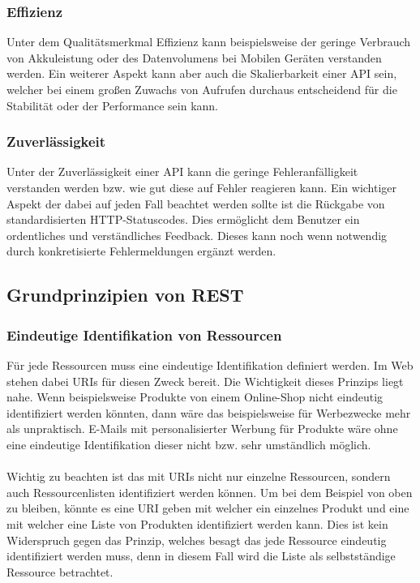 \subsubsection{Effizienz}
Unter dem Qualitätsmerkmal Effizienz kann beispielsweise der geringe Verbrauch von Akkuleistung oder des Datenvolumens bei Mobilen Geräten verstanden werden. Ein weiterer Aspekt kann aber auch die Skalierbarkeit einer \gls{API} sein, welcher bei einem großen Zuwachs von Aufrufen durchaus entscheidend für die Stabilität oder der Performance sein kann.

\subsubsection{Zuverlässigkeit}
Unter der Zuverlässigkeit einer \gls{API} kann die geringe Fehleranfälligkeit verstanden werden bzw. wie gut diese auf Fehler reagieren kann. Ein wichtiger Aspekt der dabei auf jeden Fall beachtet werden sollte ist die Rückgabe von standardisierten HTTP-Statuscodes. Dies ermöglicht dem Benutzer ein ordentliches und verständliches Feedback. Dieses kann noch wenn notwendig durch konkretisierte Fehlermeldungen ergänzt werden.

\subsection{Grundprinzipien von REST}\label{sec:basePrincipleREST}
\subsubsection{Eindeutige Identifikation von Ressourcen}
Für jede Ressourcen muss eine eindeutige Identifikation definiert werden. Im Web stehen dabei \glspl{URI} für diesen Zweck bereit. Die Wichtigkeit dieses Prinzips liegt nahe. Wenn beispielsweise Produkte von einem Online-Shop nicht eindeutig identifiziert werden könnten, dann wäre das beispielsweise für Werbezwecke mehr als unpraktisch. E-Mails mit personalisierter Werbung für Produkte wäre ohne eine eindeutige Identifikation dieser nicht bzw. sehr umständlich möglich.\\
\\
Wichtig zu beachten ist das mit \glspl{URI} nicht nur einzelne Ressourcen, sondern auch Ressourcenlisten identifiziert werden können. Um bei dem Beispiel von oben zu bleiben, könnte es eine \gls{URI} geben mit welcher ein einzelnes Produkt und eine mit welcher eine Liste von Produkten identifiziert werden kann. Dies ist kein Widerspruch gegen das Prinzip, welches besagt das jede Ressource eindeutig identifiziert werden muss, denn in diesem Fall wird die Liste als selbstständige Ressource betrachtet.

